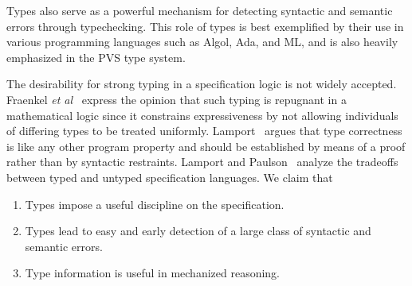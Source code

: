 \documentclass [12pt,twoside]{cslreport}
\begin{document}
Types also serve as a powerful mechanism for detecting syntactic and
semantic errors through typechecking.  This role of types is best
exemplified by their use in various programming languages such as Algol,
Ada, and ML, and is also heavily emphasized in the PVS type
system.

The desirability for strong typing in a specification
logic is not widely accepted.  Fraenkel {\em et
al\/}~\cite{Fraenkel-etal84} express
the opinion that such 
typing is repugnant in a mathematical logic since it constrains
expressiveness by not allowing individuals of differing types to be
treated uniformly.  Lamport~\cite{TLA:TOPLAS94} argues that type
correctness is like any other 
program property and should be established by means of a proof rather than
by syntactic restraints.  Lamport and Paulson~\cite{Lamport&Paulson97}
analyze the tradeoffs between typed and untyped specification languages.  
We claim that
\begin{enumerate}
\item Types impose a useful discipline on the specification.
\item Types lead to easy and early detection of a large class of
syntactic and  semantic errors.
\item Type information is useful in mechanized reasoning.
\end{enumerate}


\end{document}
